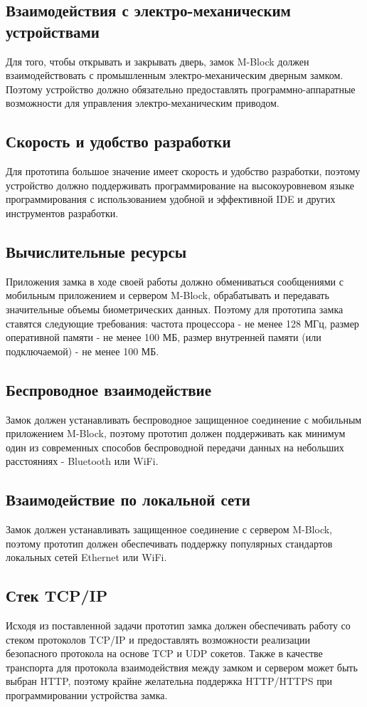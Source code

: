 \subsection{Взаимодействия с электро-механическим устройствами}
Для того, чтобы открывать и закрывать дверь, замок M-Block должен взаимодействовать с промышленным электро-механическим дверным замком. Поэтому устройство должно обязательно предоставлять программно-аппаратные возможности для управления электро-механическим приводом.

\subsection{Скорость и удобство разработки}
Для прототипа большое значение имеет скорость и удобство разработки, поэтому устройство должно поддерживать программирование на высокоуровневом языке программирования с использованием удобной и эффективной IDE и других инструментов разработки.

\subsection{Вычислительные ресурсы}
Приложения замка в ходе своей работы должно обмениваться сообщениями с мобильным приложением и сервером M-Block, обрабатывать и передавать значительные объемы биометрических данных. Поэтому для прототипа замка ставятся следующие требования: частота процессора - не менее 128 МГц, размер оперативной памяти - не менее 100 МБ, размер внутренней памяти (или подключаемой) - не менее 100 МБ.

\subsection{Беспроводное взаимодействие}
Замок должен устанавливать беспроводное защищенное соединение с мобильным приложением M-Block, поэтому прототип должен поддерживать как минимум один из современных способов беспроводной передачи данных на небольших расстояниях - Bluetooth или WiFi.

\subsection{Взаимодействие по локальной сети}
Замок должен устанавливать защищенное соединение с сервером M-Block, поэтому прототип должен обеспечивать поддержку популярных стандартов локальных сетей Ethernet или WiFi.

\subsection{Стек TCP/IP}
Исходя из поставленной задачи прототип замка должен обеспечивать работу со стеком протоколов TCP/IP и предоставлять возможности реализации безопасного протокола на основе TCP и UDP сокетов. Также в качестве транспорта для протокола взаимодействия между замком и сервером может быть выбран HTTP, поэтому крайне желательна поддержка HTTP/HTTPS при программировании устройства замка.

